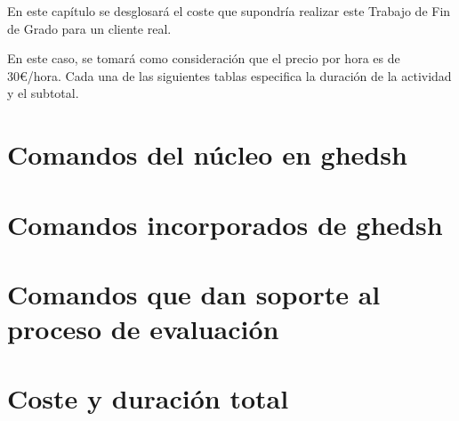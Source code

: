 


En este capítulo se desglosará el coste que supondría realizar este Trabajo de Fin de Grado para un cliente real.
\bigskip

En este caso, se tomará como consideración que el precio por hora es de 30\euro{}/hora. Cada una de las siguientes tablas especifica la duración de la actividad y el subtotal.

\section{Comandos del núcleo en ghedsh}
\label{6:sec:1}

\section{Comandos incorporados de ghedsh}
\label{6:sec:2}

\section{Comandos que dan soporte al proceso de evaluación}
\label{6:sec:3}



\section{Coste y duración total}
\label{6:sec:4}



